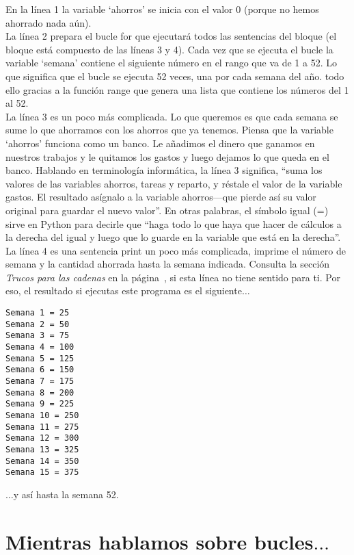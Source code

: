 En la línea 1 la variable `ahorros' se inicia con el valor 0 (porque no hemos ahorrado nada aún).\\
La línea 2 prepara el bucle for que ejecutará todos las sentencias del bloque (el bloque está compuesto de las líneas 3 y 4).  Cada vez que se ejecuta el bucle la variable `semana' contiene el siguiente número en el rango que va de 1 a 52. Lo que significa que el bucle se ejecuta 52 veces, una por cada semana del año. todo ello gracias a la función range que genera una lista que contiene los números del 1 al 52.\\
La línea 3 es un poco más complicada.  Lo que queremos es que cada semana se sume lo que ahorramos con los ahorros que ya tenemos.   Piensa que la variable `ahorros' funciona como un banco.  Le añadimos el dinero que ganamos en nuestros trabajos y le quitamos los gastos y luego dejamos lo que queda en el banco.  Hablando en terminología informática, la línea 3 significa, ``suma los valores de las variables ahorros, tareas y  reparto, y réstale el valor de la variable gastos. El resultado asígnalo a la variable ahorros---que pierde así su valor original para guardar el nuevo valor''. En otras palabras, el símbolo igual (=) sirve en Python para decirle que ``haga todo lo que haya que hacer de cálculos a la derecha del igual y luego que lo guarde en la variable que está en la derecha''.\\ 
La línea 4 es una sentencia print un poco más complicada, imprime el número de semana y la cantidad ahorrada hasta la semana indicada.  Consulta la sección \emph{Trucos para las cadenas} en la página~\pageref{trickswithstrings}, si esta línea no tiene sentido para ti.  Por eso, el resultado si ejecutas este programa es el siguiente$\ldots$

\begin{listing}
\begin{verbatim}
Semana 1 = 25
Semana 2 = 50
Semana 3 = 75
Semana 4 = 100
Semana 5 = 125
Semana 6 = 150
Semana 7 = 175
Semana 8 = 200
Semana 9 = 225
Semana 10 = 250
Semana 11 = 275
Semana 12 = 300
Semana 13 = 325
Semana 14 = 350
Semana 15 = 375
\end{verbatim}
\end{listing}

$\ldots$y así hasta la semana 52.

\section{Mientras hablamos sobre bucles$\ldots$}

